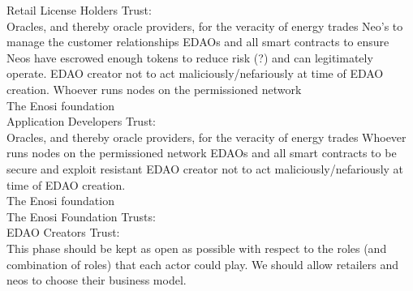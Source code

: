 \documentclass{article}
\theoremstyle{definition}
\theoremstyle{plain} %
\begin{document}
Retail License Holders Trust:\\

Oracles, and thereby oracle providers, for the veracity of energy trades
Neo’s to manage the customer relationships
EDAOs and all smart contracts to ensure Neos have escrowed enough tokens to reduce risk (?) and can legitimately operate.
EDAO creator not to act maliciously/nefariously at time of EDAO creation.
Whoever runs nodes on the permissioned network \\

The Enosi foundation\\

Application Developers Trust:\\

Oracles, and thereby oracle providers, for the veracity of energy trades
Whoever runs nodes on the permissioned network
EDAOs and all smart contracts to be secure and exploit resistant
EDAO creator not to act maliciously/nefariously at time of EDAO creation.\\

The Enosi foundation \\

The Enosi Foundation Trusts:\\

EDAO Creators Trust:\\



\noindent This phase should be kept as open as possible with respect to the roles (and combination of roles) that each actor could play. We should allow retailers and neos to choose their business model. \\
\end{document}
